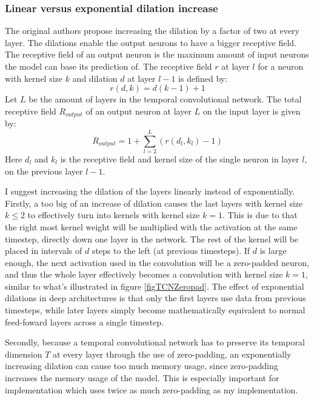 \documentclass[a4paper, twoside]{article}
\begin{document}
\subsubsection{Linear versus exponential dilation increase}
The original authors propose increasing the dilation by a factor of two at every layer. The dilations enable the output neurons to have a bigger receptive field. The receptive field of an output neuron is the maximum amount of input neurons the model can base its prediction of. The receptive field $r$ at layer $l$ for a neuron with kernel size $k$ and dilation $d$ at layer $l-1$ is defined by: 
\begin{equation}
r(d, k) = d(k-1) +1
\end{equation}
Let $L$ be the amount of layers in the temporal convolutional network. The total receptive field $R_{output}$ of an output neuron at layer $L$ on the input layer is given by:
\begin{equation}
R_{output} = 1+\sum^L_{l=2} (r(d_l, k_l) -1)
\end{equation}
Here $d_l$ and $k_l$ is the receptive field and kernel size of the single neuron in layer $l$, on the previous layer $l-1$.

I suggest increasing the dilation of the layers linearly instead of exponentially. Firstly, a too big of an increase of dilation causes the last layers with kernel size $k \leq 2$ to effectively turn into kernels with kernel size $k=1$. This is due to that the right most kernel weight will be multiplied with the activation at the same timestep, directly down one layer in the network. The rest of the kernel will be placed in intervals of $d$ steps to the left (at previous timesteps). If $d$ is large enough, the next activation used in the convolution will be a zero-padded neuron, and thus the whole layer effectively becomes a convolution with kernel size $k=1$, similar to what's illustrated in figure \ref{figTCNZeropad}. The effect of exponential dilations in deep architectures is that only the first layers use data from previous timesteps, while later layers simply become mathematically equivalent to normal feed-foward layers across a single timestep.

Secondly, because a temporal convolutional network has to preserve its temporal dimension $T$ at every layer through the use of zero-padding, an exponentially increasing dilation can cause too much memory usage, since zero-padding increases the memory usage of the model. This is especially important for \cite{tcn} implementation which uses twice as much zero-padding as my implementation.
\end{document}
